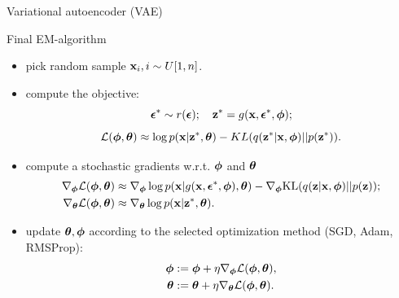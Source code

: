 	\begin{frame}{Variational autoencoder (VAE)}
		\begin{block}{Final EM-algorithm}
			\begin{itemize}
				\item pick random sample $\mathbf{x}_i, i \sim U[1, n]$.
				\item compute the objective:
				\vspace{-0.3cm}
				\[
				\boldsymbol{\epsilon}^* \sim r(\boldsymbol{\epsilon}); \quad \mathbf{z}^* = g(\mathbf{x}, \boldsymbol{\epsilon}^*, \boldsymbol{\phi});
				\]
				\[
				\mathcal{L}(\boldsymbol{\phi}, \boldsymbol{\theta}) \approx  \log p(\mathbf{x} | \mathbf{z}^*, \boldsymbol{\theta}) - KL(q(\mathbf{z}^* | \mathbf{x}, \boldsymbol{\phi}) || p(\mathbf{z}^*)).
				\]
				\item compute a stochastic gradients w.r.t. $\boldsymbol{\phi}$ and $\boldsymbol{\theta}$
				\begin{align*}
					\nabla_{\boldsymbol{\phi}} \mathcal{L} (\boldsymbol{\phi}, \boldsymbol{\theta}) &\approx \nabla_{\boldsymbol{\phi}} \log p(\mathbf{x} | g(\mathbf{x}, \boldsymbol{\epsilon}^*, \boldsymbol{\phi}), \boldsymbol{\theta})  - \nabla_{\boldsymbol{\phi}} \text{KL}(q(\mathbf{z} | \mathbf{x}, \boldsymbol{\phi}) || p(\mathbf{z})); \\
					\nabla_{\boldsymbol{\theta}} \mathcal{L} (\boldsymbol{\phi}, \boldsymbol{\theta}) &\approx \nabla_{\boldsymbol{\theta}} \log p(\mathbf{x}|\mathbf{z}^*, \boldsymbol{\theta}).
				\end{align*}
				\item update $\boldsymbol{\theta}, \boldsymbol{\phi}$ according to the selected optimization method (SGD, Adam, RMSProp):
				\begin{align*}
					\boldsymbol{\phi} &:= \boldsymbol{\phi} + \eta \nabla_{\boldsymbol{\phi}} \mathcal{L}(\boldsymbol{\phi}, \boldsymbol{\theta}), \\
					\boldsymbol{\theta} &:= \boldsymbol{\theta} + \eta \nabla_{\boldsymbol{\theta}} \mathcal{L}(\boldsymbol{\phi}, \boldsymbol{\theta}).
				\end{align*}
			\end{itemize}
		\end{block}
	\end{frame}
